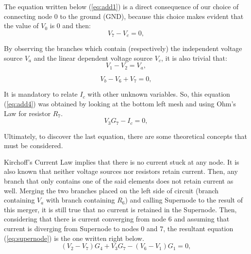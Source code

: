 The equation written below (\ref{eq:add1}) is a direct consequence of our choice of connecting node 0 to the ground (GND), because this choice makes evident that the value of $V_0$ is 0 and then:
\begin{equation}
  V_{7} - V_{c} = 0,
  \label{eq:add1}
\end{equation}

By observing the branches which contain (respectively) the independent voltage source $V_a$ and the linear dependent voltage source $V_c$, it is also trivial that:
\begin{equation}
  V_{1} - V_{2} = V_{a},
  \label{eq:add2}
\end{equation}

\begin{equation}
  V_{b} - V_{6} + V_{7} = 0,
  \label{eq:add3}
\end{equation}

It is mandatory to relate $I_c$ with other unknown variables. So, this equation (\ref{eq:add4}) was obtained by looking at the bottom left mesh and using Ohm's Law for resistor $R_7$.
\begin{equation}
  V_{3}G_{7} - I_{c} = 0,
  \label{eq:add4}
\end{equation}

Ultimately, to discover the last equation, there are some theoretical concepts that must be considered. 

Kirchoff's Current Law implies that there is no current stuck at any node. It is also known that neither voltage sources nor resistors retain current. Then, any branch that only contains one of the said elements does not retain current as well. Merging the two branches placed on the left side of circuit (branch containing $V_a$ with branch containing $R_6$) and calling Supernode to the result of this merger, it is still true that no current is retained in the Supernode. Then, considering that there is current converging from node 6 and assuming that current is diverging from Supernode to nodes 0 and 7, the resultant equation (\ref{eq:supernode}) is the one written right below.
\begin{equation}
  (V_{2} - V_{7})G_{4} + V_{3}G_{7} - (V_{6} - V_{1})G_{1} = 0,
  \label{eq:supernode}
\end{equation}

